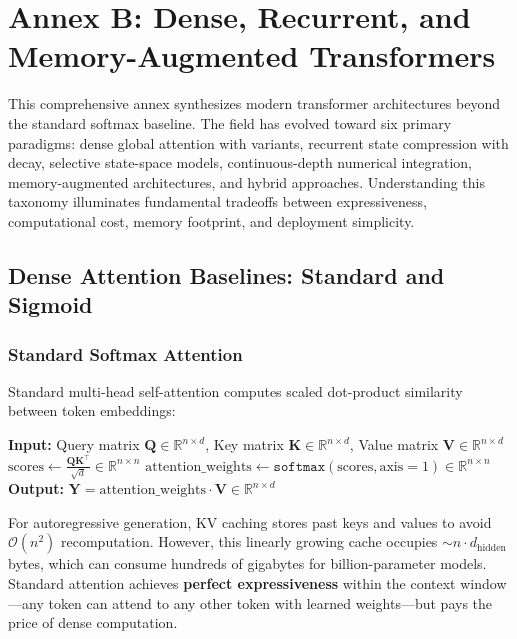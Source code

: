 \documentclass[11pt,a4paper]{article}
\begin{document}
\section{Annex B: Dense, Recurrent, and Memory-Augmented Transformers}
\label{sec:annex-transformer}

This comprehensive annex synthesizes modern transformer architectures beyond the standard softmax baseline. The field has evolved toward six primary paradigms: dense global attention with variants, recurrent state compression with decay, selective state-space models, continuous-depth numerical integration, memory-augmented architectures, and hybrid approaches. Understanding this taxonomy illuminates fundamental tradeoffs between expressiveness, computational cost, memory footprint, and deployment simplicity.

\subsection{Dense Attention Baselines: Standard and Sigmoid}

\subsubsection{Standard Softmax Attention}
Standard multi-head self-attention \citep{vaswani_attention_2017} computes scaled dot-product similarity between token embeddings:

\begin{algorithmic}[1]
\State \textbf{Input:} Query matrix $\mathbf{Q} \in \mathbb{R}^{n \times d}$, Key matrix $\mathbf{K} \in \mathbb{R}^{n \times d}$, Value matrix $\mathbf{V} \in \mathbb{R}^{n \times d}$
\State $\text{scores} \gets \frac{\mathbf{Q}\mathbf{K}^\top}{\sqrt{d}} \in \mathbb{R}^{n \times n}$ 
\State $\text{attention\_weights} \gets \texttt{softmax}(\text{scores}, \text{axis}=1) \in \mathbb{R}^{n \times n}$ 
\State \textbf{Output:} $\mathbf{Y} = \text{attention\_weights} \cdot \mathbf{V} \in \mathbb{R}^{n \times d}$ 
\end{algorithmic}

For autoregressive generation, KV caching stores past keys and values to avoid $\mathcal{O}(n^2)$ recomputation. However, this linearly growing cache occupies $\sim n \cdot d_{\text{hidden}}$ bytes, which can consume hundreds of gigabytes for billion-parameter models. Standard attention achieves \textbf{perfect expressiveness} within the context window---any token can attend to any other token with learned weights---but pays the price of dense computation.
\end{document}

